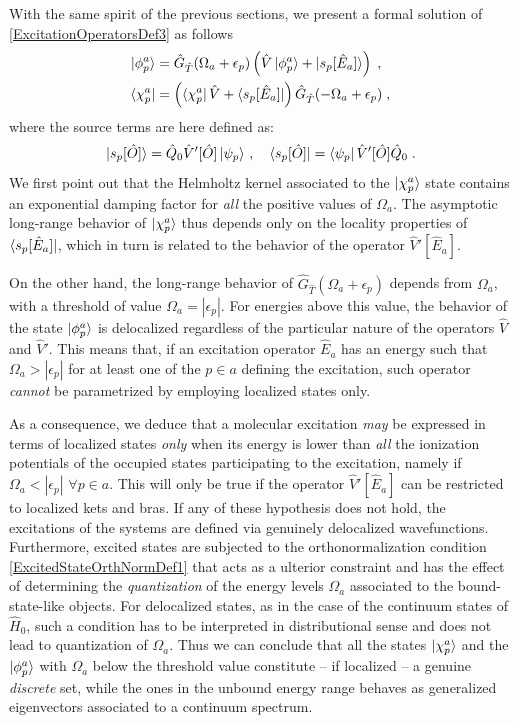 \documentclass[reprint,aps,prb]{revtex4-1}
\newcommand{\eps}{\epsilon}
\newcommand{\be}{\begin{equation}}
\newcommand{\ee}{\end{equation}}
\newcommand{\nn}{\notag}
\newcommand{\op}[1]{\hat {#1}}
\newcommand{\hnot}{\op{H}_0}
\newcommand{\GH}{\op G_{\op T}}
\begin{document}
With the same spirit of the previous sections, we present a formal solution of \eqref{ExcitationOperatorsDef3} as follows
\begin{align}
\ket{\phi^a_p} &= \GH(\Omega_a+\eps_p)\left(\op V \ket{\phi^a_p} + \ket{s_p[\op E_a]} \right) \;, \nn \\
\bra {\chi^a_p} &=\left(\bra{\chi^a_p} \op V  + \bra{s_p[\op E_a]}\right)  \GH(-\Omega_a+\eps_p)\;,
\end{align}
where the source terms are here defined as:
\be
 \ket{s_p[\op O]} =  \op Q_0 \op V'[\op O] \ket{\psi_p}\,, \quad
 \bra{s_p[\op O]} =   \bra{\psi_p} \op V'[\op O] \op Q_0 \nn \;.
\ee
We first point out that the Helmholtz kernel associated to the $\ket{\chi^a_p}$ state
contains an exponential damping factor for \emph{all} the positive values of $\Omega_a$.
The asymptotic long-range behavior of $\ket{\chi^a_p}$ thus depends only on the locality properties of
$\bra{s_p[\op E_a]}$, which in turn is related to the behavior of the operator $\op V'[\op E_a]$.

On the other hand, the long-range behavior of $\GH(\Omega_a+\eps_p)$ depends from
$\Omega_a$, with a threshold of value $\Omega_a=|\eps_p|$.
For energies above this value, the behavior of the state $\ket{\phi^a_p}$ is
delocalized regardless of the particular nature of the operators $\op V$ and $\op V'$.
This means that, if an excitation operator $\op E_a$ has an energy such that
$\Omega_a>|\eps_p|$  for at least one of the $p \in a$ defining the excitation,
such operator \emph{cannot} be parametrized by employing localized states only.

As a consequence, we deduce that a molecular excitation \emph{may} be expressed in terms of localized states
\emph{only} when its energy is lower than \emph{all} the ionization potentials of the occupied states participating to the excitation,
namely if $\Omega_a<|\eps_p|$ $\forall p \in a$. This will only be true if the operator
$\op V'[\op E_a]$ can be restricted to localized kets and bras.
If any of these hypothesis does not hold, the excitations of the systems are defined via genuinely delocalized wavefunctions.
Furthermore, excited states are subjected to the orthonormalization condition
\eqref{ExcitedStateOrthNormDef1} that acts as a ulterior constraint and has the effect of determining the \emph{quantization}
of the energy levels $\Omega_a$ associated to the bound-state-like objects.
For delocalized states, as in the case of the continuum states of $\hnot$,
such a condition has to be interpreted in distributional sense and does not lead to quantization of $\Omega_a$.
Thus we can conclude that all the states $\ket{\chi^a_p}$ and the $\ket{\phi^a_p}$ with $\Omega_a$ below the threshold value constitute
-- if localized -- a genuine \emph{discrete} set, while the ones in the unbound energy range behaves as generalized eigenvectors associated to a
continuum spectrum.
\end{document}
